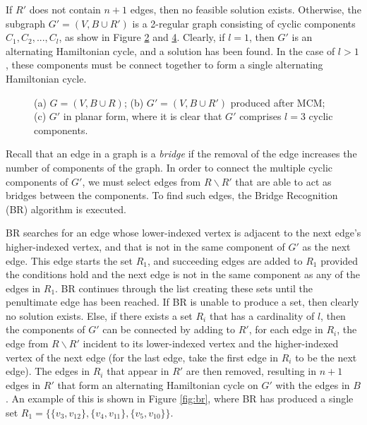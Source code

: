 \documentclass{elsarticle}
\begin{document}
If $R'$ does not contain $n+1$ edges, then no feasible solution exists. Otherwise, the subgraph $G'=(V, B \cup R')$ is a 2-regular graph consisting of cyclic components $C_1,C_2,...,C_l$, as show in Figure \ref{fig:mcm} and \ref{fig:mps}. Clearly, if $l = 1$, then $G'$ is an alternating Hamiltonian cycle, and a solution has been found. In the case of $l > 1$, these components must be connect together to form a single alternating Hamiltonian cycle.

\begin{figure}[H]	
	\centering
	\begin{subfigure}[h]{0.32\textwidth}
		
		\caption{}
		\label{fig:threshold}
	\end{subfigure} \hspace{5mm}
	\begin{subfigure}[h]{0.32\textwidth}
		
		\caption{}
		\label{fig:mcm}
	\end{subfigure} \hspace{5mm}
	\begin{subfigure}[h]{0.261\textwidth}
		
		\caption{}
		\label{fig:mps}
	\end{subfigure}
	\caption{(a) $G = (V, B\cup R)$; (b) $G'=(V, B \cup R')$ produced after MCM; (c) $G'$ in planar form, where it is clear that $G'$ comprises $l = 3$ cyclic components.}
\end{figure}

Recall that an edge in a graph is a \emph{bridge} if the removal of the edge increases the number of components of the graph. In order to connect the multiple cyclic components of $G'$, we must select edges from $R \backslash R'$ that are able to act as bridges between the components. To find such edges, the Bridge Recognition (BR) algorithm is executed.

BR searches for an edge whose lower-indexed vertex is adjacent to the next edge's higher-indexed vertex, and that is not in the same component of $G'$ as the next edge. This edge starts the set $R_1$, and succeeding edges are added to $R_1$ provided the conditions hold and the next edge is not in the same component as any of the edges in $R_1$. BR continues through the list creating these sets until the penultimate edge has been reached. If BR is unable to produce a set, then clearly no solution exists. Else, if there exists a set $R_i$ that has a cardinality of $l$, then the components of $G'$ can be connected by adding to $R'$, for each edge in $R_i$, the edge from $R \backslash R'$ incident to its lower-indexed vertex and the higher-indexed vertex of the next edge (for the last edge, take the first edge in $R_i$ to be the next edge). The edges in $R_i$ that appear in $R'$ are then removed, resulting in $n+1$ edges in $R'$ that form an alternating Hamiltonian cycle on $G'$ with the edges in $B$. An example of this is shown in Figure \ref{fig:br}, where BR has produced a single set $R_1 = \{\{v_3, v_{12}\},\{v_4, v_{11}\}, \{v_5, v_{10}\}\}$.
\end{document}
